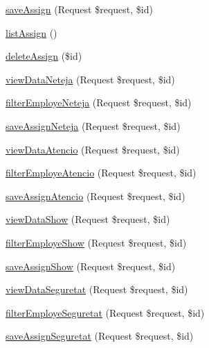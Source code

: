 \begin{DoxyCompactItemize}
\item 
\mbox{\hyperlink{class_app_1_1_http_1_1_controllers_1_1_assign_emp_zona_controller_a829bc0cd9e313184335b16c38e78239f}{save\+Assign}} (Request \$request, \$id)
\item 
\mbox{\hyperlink{class_app_1_1_http_1_1_controllers_1_1_assign_emp_zona_controller_af8793b32c03ebf818f1324c9388c51e3}{list\+Assign}} ()
\item 
\mbox{\hyperlink{class_app_1_1_http_1_1_controllers_1_1_assign_emp_zona_controller_a8ffc923d37e75322c1069fa197623a36}{delete\+Assign}} (\$id)
\item 
\mbox{\hyperlink{class_app_1_1_http_1_1_controllers_1_1_assign_emp_zona_controller_aef75e78c3efd2caf5ea64c4619ff0e68}{view\+Data\+Neteja}} (Request \$request, \$id)
\item 
\mbox{\hyperlink{class_app_1_1_http_1_1_controllers_1_1_assign_emp_zona_controller_a048a35ca588d678ad24e5569bafccd98}{filter\+Employe\+Neteja}} (Request \$request, \$id)
\item 
\mbox{\hyperlink{class_app_1_1_http_1_1_controllers_1_1_assign_emp_zona_controller_a24eeaa598241b68e6561ac621a27d81a}{save\+Assign\+Neteja}} (Request \$request, \$id)
\item 
\mbox{\hyperlink{class_app_1_1_http_1_1_controllers_1_1_assign_emp_zona_controller_ac67e31f01289adfcdf2a51af5131b701}{view\+Data\+Atencio}} (Request \$request, \$id)
\item 
\mbox{\hyperlink{class_app_1_1_http_1_1_controllers_1_1_assign_emp_zona_controller_a2adea7498be3b122cf3a1b1bb7c97f37}{filter\+Employe\+Atencio}} (Request \$request, \$id)
\item 
\mbox{\hyperlink{class_app_1_1_http_1_1_controllers_1_1_assign_emp_zona_controller_ad7c751e86010bdf82031695cc8149dd2}{save\+Assign\+Atencio}} (Request \$request, \$id)
\item 
\mbox{\hyperlink{class_app_1_1_http_1_1_controllers_1_1_assign_emp_zona_controller_a10c5d755f37c32d58a2bba2db5eab67b}{view\+Data\+Show}} (Request \$request, \$id)
\item 
\mbox{\hyperlink{class_app_1_1_http_1_1_controllers_1_1_assign_emp_zona_controller_a3081a271e1b791d2a85fe449ac6283b2}{filter\+Employe\+Show}} (Request \$request, \$id)
\item 
\mbox{\hyperlink{class_app_1_1_http_1_1_controllers_1_1_assign_emp_zona_controller_afa32a355ec2289dd31c9e367563c1269}{save\+Assign\+Show}} (Request \$request, \$id)
\item 
\mbox{\hyperlink{class_app_1_1_http_1_1_controllers_1_1_assign_emp_zona_controller_a6ef933019184690680035bf105bfa476}{view\+Data\+Seguretat}} (Request \$request, \$id)
\item 
\mbox{\hyperlink{class_app_1_1_http_1_1_controllers_1_1_assign_emp_zona_controller_afbc7164f74df7566388ab3d2d3115f94}{filter\+Employe\+Seguretat}} (Request \$request, \$id)
\item 
\mbox{\hyperlink{class_app_1_1_http_1_1_controllers_1_1_assign_emp_zona_controller_a486e8f2d5eb4f9c6a9df1d2249d7fe3a}{save\+Assign\+Seguretat}} (Request \$request, \$id)
\end{DoxyCompactItemize}


